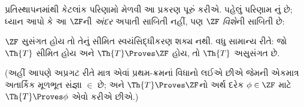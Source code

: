 \documentclass[../../../include/open-logic-section]{subfiles}
\begin{document}
	
પ્રતિસ્થાપનમાંથી કેટલાંક પરિણામો મેળવી આ પ્રકરણ પૂરું
કરીએ. પહેલું પરિણામ \citet{Montague1961}નું છે; ધ્યાન
આપો કે આ $\ZF$ની \emph{અંદર} અપાતી સાબિતી નહીં,
પણ $\ZF$ \emph{વિશે}ની સાબિતી છે:
\begin{thm}
	$\ZF$ સુસંગત હોય તો તેનું સીમિત સ્વયંસિદ્ધીકરણ શક્ય નથી. વધુ સામાન્ય રીતે:
	જો $\Th{T}$ સીમિત હોય અને $\Th{T} \Proves \ZF$ હોય,
	તો $\Th{T}$ અસુસંગત છે.
	
	(અહીં આપણે અપ્રગટ રીતે માત્ર એવાં પ્રથમ-ક્રમનાં
	વિધાનો લઈએ છીએ જેમની એકમાત્ર અતાર્કિક મૂળભૂત
	સંજ્ઞા $\in$ છે; અને $\Th{T} \Proves \ZF$નો
	અર્થ દરેક $\phi \in \ZF$ માટે
	$\Th{T} \Proves \phi$ એવો કરીએ છીએ.)
\end{thm}
\end{document}
